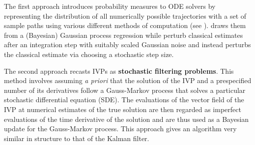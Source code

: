 The first approach introduces probability measures to ODE solvers by representing the distribution of all numerically possible trajectories with a set of sample paths using various different methods of computation (see \textcolor{blue}{\cite{chkrebtii2016bayesian,conrad2017statistical,teymur2016probabilistic,lie2019strong,abdulle2020random,teymur2018implicit}}). \textcolor{blue}{\cite{chkrebtii2016bayesian}} draws them from a (Bayesian) Gaussian process regression while \textcolor{blue}{\cite{conrad2017statistical,teymur2016probabilistic,lie2019strong,teymur2018implicit}} perturb classical estimates after an integration step with suitably scaled Gaussian noise and \textcolor{blue}{\cite{abdulle2020random}} instead perturbs the classical estimate via choosing a stochastic step size.

The second approach \textcolor{blue}{\cite{schober2014probabilistic,kersting2016active,magnani2017bayesian,schober2019probabilistic,tronarp2019probabilistic,kersting2018convergence}} recasts IVPs as \textbf{stochastic filtering problems}. This method involves assuming \textit{a priori} that the solution of the IVP and a prespecified number of its derivatives follow a Gauss-Markov process that solves a particular stochastic differential equation (SDE). The evaluations of the vector field of the IVP at numerical estimates of the true solution are then regarded as imperfect evaluations of the time derivative of the solution and are thus used as a Bayesian update for the Gauss-Markov process. This approach gives an algorithm very similar in structure to that of the Kalman filter.

